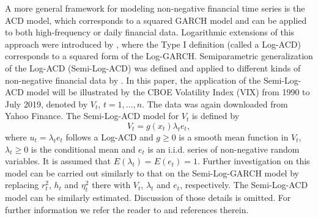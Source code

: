 A more general framework for modeling non-negative financial time series is the ACD \citep[autoregressive conditional duration,][]{engle1998acd} model, which corresponds to a squared GARCH model and can be applied to both high-frequency or daily financial data. Logarithmic extensions of this approach were introduced by \citet{bauwens2000lacd}, where the Type I definition (called a Log-ACD) corresponds to a squared form of the Log-GARCH. Semiparametric generalization of the Log-ACD (Semi-Log-ACD) was defined and applied to different kinds of non-negative financial data by \citet{forstinger2018modelling}. 
In this paper, the application of the Semi-Log-ACD model will be illustrated by the CBOE Volatility Index (VIX) from 1990 to July 2019, denoted by $V_t$, $t=1, ..., n$. The data was again downloaded from Yahoo Finance. The Semi-Log-ACD model for $V_t$ is defined by
\begin{equation} \label{eq:SemiLogACD}
V_t=g\left(x_t\right) \lambda_t e_t, 
\end{equation} 
where $u_t=\lambda_t e_t$ follows a Log-ACD and $g\ge0$ is a smooth mean function in $V_t$, $\lambda_t\ge0$ is the conditional mean and $e_t$ is an i.i.d. series of non-negative random variables. It is assumed that $E\left(\lambda_t\right)=E\left(e_t\right)=1$. Further investigation on this model can be carried out similarly to that on the Semi-Log-GARCH model by replacing $r_t^2$, $h_t$ and $\eta_t^2$ there with $V_t$, $\lambda_t$ and $e_t$, respectively. 
The Semi-Log-ACD model can be similarly estimated. Discussion of those details is omitted. For further information we refer the reader to \citet{forstinger2018modelling} and references therein.	

